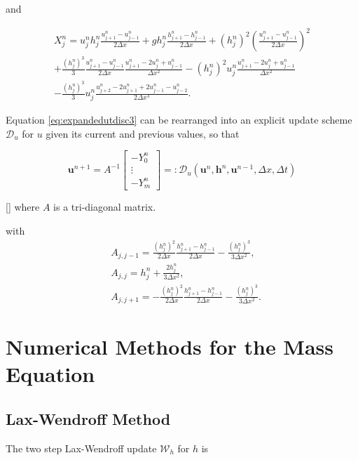 and

\begin{multline*}
X_j^n = u_j^nh_j^n\frac{u^{n}_{j+1} -u^{n}_{j-1} }{2 \Delta x} + gh^n_j\frac{h^{n}_{j+1} -h^{n}_{j-1} }{2 \Delta x} + \left(h^n_j\right)^2\left(\frac{u^{n}_{j+1} -u^{n}_{j-1} }{2 \Delta x} \right)^2  \\ + \frac{\left(h^n_j\right)^3}{3}\frac{u^{n}_{j+1} -u^{n}_{j-1} }{2 \Delta x}\frac{u^{n}_{j+1} - 2u^{n}_{j} + u^{n}_{j-1} }{\Delta x^2} - \left(h^n_j\right)^2u_j^n\frac{u^{n}_{j+1} - 2u^{n}_{j} + u^{n}_{j-1} }{\Delta x^2} \\- \frac{\left(h^n_j\right)^3}{3}u^n_j \frac{u^{n}_{j+2} - 2u^{n}_{j+1} + 2u^{n}_{j-1} - u^{n}_{j-2} }{2\Delta x^3}.
\end{multline*}

Equation \eqref{eq:expandedutdisc3} can be rearranged into an explicit update scheme $\mathcal{D}_u$ for $u$ given its current and previous values, so that

\begin{equation}
\boldsymbol{u}^{n+ 1}
= A^{-1} \left[\begin{array}{c}
-Y^n_0 \\
\vdots \\
-Y^n_m \end{array}\right] =: \mathcal{D}_u\left(\boldsymbol{u}^n,\boldsymbol{h}^n, \boldsymbol{u}^{n-1}, \Delta x, \Delta t \right)
\label{eq:FDcentforu}
\end{equation}

[]
where $A$ is a tri-diagonal matrix.

with
\begin{align}
	&A_{j,j-1} = \frac{\left(h^n_j\right)^2}{2\Delta x}\frac{h^n_{j+1} - h^n_{j-1}}{2\Delta x} - \frac{\left(h^n_j\right)^3}{3 \Delta x^2}  ,\\
	&A_{j,j} = h^n_j + \frac{2 h^n_j}{3 \Delta x^2}, \\
	&A_{j,j+1} = -\frac{\left(h^n_j\right)^2}{2\Delta x}\frac{h^n_{j+1} - h^n_{j-1}}{2\Delta x} - \frac{\left(h^n_j\right)^3}{3 \Delta x^2}.
\end{align}


\section{Numerical Methods for the Mass Equation}

\subsection{Lax-Wendroff Method}
The two step Lax-Wendroff update $\mathcal{W}_h$ for $h$ is

